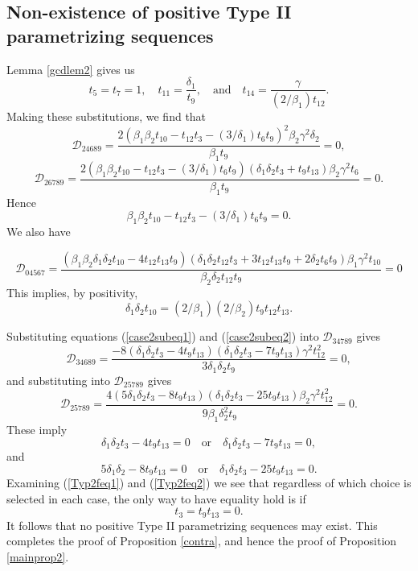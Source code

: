 \documentclass[letterpaper,10pt]{amsart}
\newcommand{\D}{{\mathcal{D}}}
\theoremstyle{definition}
\numberwithin{equation}{section}
\begin{document}
 







\subsection{Non-existence of positive Type II parametrizing sequences}  

Lemma \ref{gcdlem2} gives us
\begin{equation} t_5 = t_7 = 1, \quad t_{11} = \frac{\delta_1}{t_9}, \quad \text{and} \quad t_{14} = \frac{\gamma}{(2/\beta_1) t_{12}}.
\end{equation} 
Making these substitutions, we find that 
\[\D_{24689} = \frac{2 (\beta_1 \beta_2  t_{10} - t_{12} t_3 - (3/\delta_1) t_6 t_9)^2 \beta_2 \gamma^2 \delta_2}{\beta_1 t_9} = 0,\]
\[\D_{26789} = \frac{2 (\beta_1 \beta_2  t_{10} - t_{12} t_3 - (3/\delta_1) t_6 t_9)(\delta_1 \delta_2 t_3 + t_9 t_{13}) \beta_2 \gamma^2 t_6}{\beta_1 t_9} = 0.\]
Hence 
\begin{equation} \label{case2subeq1} \beta_1 \beta_2  t_{10} - t_{12} t_3 - (3/\delta_1) t_6 t_9  = 0.
\end{equation}
We also have

\begin{equation}
\D_{04567}  =  \frac{(\beta_1 \beta_2 \delta_1 \delta_2 t_{10} - 4 t_{12} t_{13}t_9)(\delta_1 \delta_2 t_{12} t_3 + 3 t_{12} t_{13} t_9 + 2 \delta_2 t_6 t_9) \beta_1 \gamma^2 t_{10}}{\beta_2 \delta_2 t_{12} t_{9}}  =  0
\end{equation}
This implies, by positivity,
\begin{equation} \label{case2subeq2} \delta_1 \delta_2 t_{10} = (2/\beta_1)(2/\beta_2) t_9 t_{12} t_{13}. 
\end{equation}

Substituting equations (\ref{case2subeq1}) and (\ref{case2subeq2}) into $\D_{34789}$ gives 
\[\D_{34689} = \frac{-8(\delta_1 \delta_2 t_3 - 4 t_9 t_{13})(\delta_1 \delta_2 t_3 - 7 t_9 t_{13}) \gamma^2 t_{12}^2}{3\delta_1 \delta_2 t_9} = 0,\]
and substituting into $\D_{25789}$ gives
\[\D_{25789} = \frac{4 (5 \delta_1 \delta_2 t_3 - 8 t_9 t_{13})(\delta_1 \delta_2 t_3 - 25 t_9 t_{13}) \beta_2 \gamma^2 t_{12}^2}{9 \beta_1 \delta_2^2 t_9} = 0.\]
These imply 
\begin{equation} \label{Typ2feq1} \delta_1 \delta_2 t_3 - 4 t_9 t_{13} = 0 \quad \text{or} \quad \delta_1 \delta_2 t_3 - 7 t_9 t_{13} = 0,
\end{equation} 
and
\begin{equation} \label{Typ2feq2} 5 \delta_1 \delta_2 - 8 t_9 t_{13} = 0 \quad \text{or} \quad \delta_1 \delta_2 t_3 - 25 t_9 t_{13} = 0.
\end{equation}
Examining (\ref{Typ2feq1}) and (\ref{Typ2feq2}) we see that regardless of which choice is selected in each case, the only way to have equality hold is if 
\[t_3 = t_9 t_{13} = 0.\]
It follows that no positive Type II parametrizing sequences may exist. This completes the proof of Proposition \ref{contra}, and hence the proof of Proposition \ref{mainprop2}. 
\end{document}
